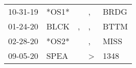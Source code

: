 \begin{supertabular}{p{0.07\textwidth}p{0.06\textwidth}p{0.02\textwidth}p{0.02\textwidth}p{0.06\textwidth}}
 10-31-19\textsuperscript{} &                   *OS1* &    &             , &  BRDG\textsuperscript{} \\
 01-24-20\textsuperscript{} &  BLCK\textsuperscript{} &  , &             , &  BTTM\textsuperscript{} \\
 02-28-20\textsuperscript{} &                   *OS2* &    &             , &  MISS\textsuperscript{} \\
 09-05-20\textsuperscript{} &  SPEA\textsuperscript{} &    &  \textgreater &  1348\textsuperscript{} \\
\end{supertabular}
